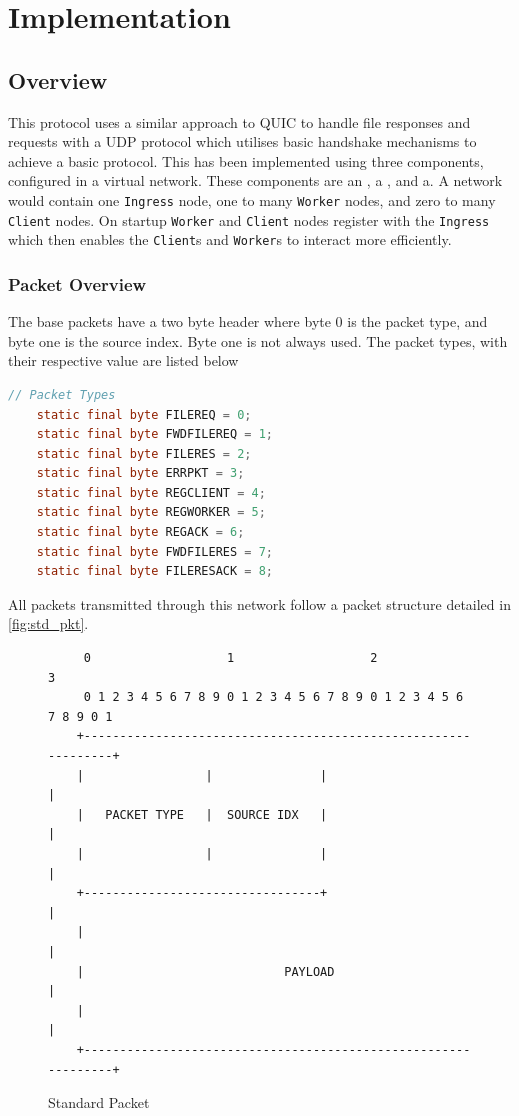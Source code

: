 \documentclass{article}
\newcommand{\code}[1]{\texttt{#1}}
\begin{document}
\section{Implementation}
\subsection{Overview}
This protocol uses a similar approach to QUIC to handle file responses and requests with a UDP protocol which utilises basic handshake mechanisms to achieve a basic protocol. This has been implemented using three components, configured in a virtual network. These components are an \code{}, a \code{}, and a\code{}. A network would contain one \code{Ingress} node, one to many \code{Worker} nodes, and zero to many \code{Client} nodes. On startup \code{Worker} and \code{Client} nodes register with the \code{Ingress} which then enables the \code{Client}s and \code{Worker}s to interact more efficiently.
\subsubsection[Packet]{Packet Overview}

The base packets have a two byte header where byte 0 is the packet type, and byte one is the source index. Byte one is not always used. The packet types, with their respective value are listed below
\begin{lstlisting}[language=java,caption={[Encoded Packet Types]Code snippet from \code{Node} with the encoded packet types},label={lst:packet_types}]
    // Packet Types
    static final byte FILEREQ = 0;
    static final byte FWDFILEREQ = 1;
    static final byte FILERES = 2;
    static final byte ERRPKT = 3;
    static final byte REGCLIENT = 4;
    static final byte REGWORKER = 5;
    static final byte REGACK = 6;
    static final byte FWDFILERES = 7;
    static final byte FILERESACK = 8;
\end{lstlisting}

All packets transmitted through this network follow a packet structure detailed in \autoref{fig:std_pkt}.
\begin{figure}[!ht]
	\centering
	\begin{BVerbatim}
	 0                   1                   2                   3  
	 0 1 2 3 4 5 6 7 8 9 0 1 2 3 4 5 6 7 8 9 0 1 2 3 4 5 6 7 8 9 0 1
	+---------------------------------------------------------------+
	|                 |               |                             |
	|   PACKET TYPE   |  SOURCE IDX   |                             |
	|                 |               |                             |
	+---------------------------------+                             |
	|                                                               |
	|                            PAYLOAD                            |
	|                                                               |
	+---------------------------------------------------------------+
	\end{BVerbatim}
	\caption{Standard Packet}
	\label{fig:std_pkt}
\end{figure}
\end{document}

